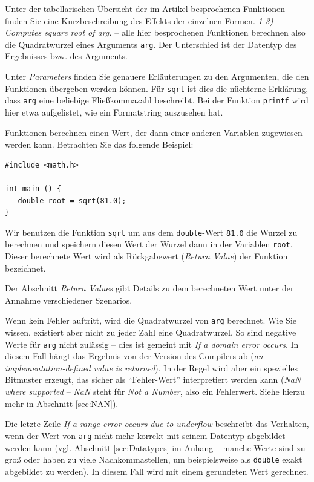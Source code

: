 Unter der tabellarischen Übersicht der im Artikel besprochenen Funktionen finden Sie eine Kurzbeschreibung des Effekts der einzelnen Formen. \emph{1-3) Computes square root of arg.} -- alle hier besprochenen Funktionen berechnen also die Quadratwurzel eines Arguments \texttt{arg}. Der Unterschied ist der Datentyp des Ergebnisses bzw. des Arguments.

Unter \emph{Parameters} finden Sie genauere Erläuterungen zu den Argumenten, die den Funktionen übergeben werden können. Für \texttt{sqrt} ist dies die nüchterne Erklärung, dass \texttt{arg} eine beliebige Fließkommazahl beschreibt. Bei der Funktion \texttt{printf} wird hier etwa aufgelistet, wie ein Formatstring auszusehen hat.

Funktionen berechnen einen Wert, der dann einer anderen Variablen zugewiesen werden kann. Betrachten Sie das folgende Beispiel:

\begin{codebox}
\begin{verbatim}
#include <math.h>

int main () {
   double root = sqrt(81.0);
}
\end{verbatim}
\end{codebox}

Wir benutzen die Funktion \texttt{sqrt} um aus dem \texttt{double}-Wert \texttt{81.0} die Wurzel zu berechnen und speichern diesen Wert der Wurzel dann in der Variablen \texttt{root}. Dieser berechnete Wert wird als Rückgabewert (\emph{Return Value}) der Funktion bezeichnet.

Der Abschnitt \emph{Return Values} gibt Details zu dem berechneten Wert unter der Annahme verschiedener Szenarios.

Wenn kein Fehler auftritt, wird die Quadratwurzel von \texttt{arg} berechnet. Wie Sie wissen, existiert aber nicht zu jeder Zahl eine Quadratwurzel. So sind negative Werte für \texttt{arg} nicht zulässig -- dies ist gemeint mit \emph{If a domain error occurs}. In diesem Fall hängt das Ergebnis von der Version des Compilers ab (\emph{an implementation-defined value is returned}). In der Regel wird aber ein spezielles Bitmuster erzeugt, das sicher als \enquote{Fehler-Wert} interpretiert werden kann (\emph{NaN where supported} -- \emph{NaN} steht für \emph{Not a Number}, also ein Fehlerwert. Siehe hierzu mehr in Abschnitt \ref{sec:NAN}).

Die letzte Zeile \emph{If a range error occurs due to underflow} beschreibt das Verhalten, wenn der Wert von \texttt{arg} nicht mehr korrekt mit seinem Datentyp abgebildet werden kann (vgl. Abschnitt \ref{sec:Datatypes} im Anhang -- manche Werte sind zu groß oder haben zu viele Nachkommastellen, um beispielsweise als \texttt{double} exakt abgebildet zu werden). In diesem Fall wird mit einem gerundeten Wert gerechnet.

